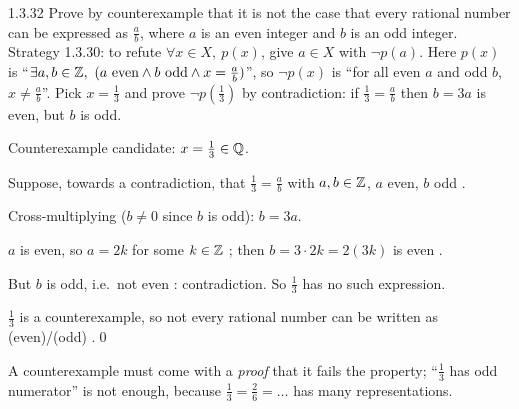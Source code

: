 \begin{bookex}[recommended]{1.3.32}
Prove by counterexample that it is not the case that every rational number can be expressed as $\frac ab$, where $a$ is an even integer and $b$ is an odd integer.
\solution
\given Strategy 1.3.30: to refute $\forall x\in X,\ p(x)$, give $a\in X$ with $\neg p(a)$. Here $p(x)$ is ``$\exists a,b\in\mathbb{Z},\ (a\text{ even}\wedge b\text{ odd}\wedge x=\frac ab)$'', so $\neg p(x)$ is ``for all even $a$ and odd $b$, $x\ne\frac ab$''.
\plan Pick $x=\frac13$ and prove $\neg p(\frac13)$ by contradiction: if $\frac13=\frac ab$ then $b=3a$ is even, but $b$ is odd.
\begin{steps}
\item Counterexample candidate: $x=\frac13\in\mathbb{Q}$.
\item Suppose, towards a contradiction, that $\frac13=\frac ab$ with $a,b\in\mathbb{Z}$, $a$ even, $b$ odd .
\item Cross-multiplying ($b\ne0$ since $b$ is odd): $b=3a$.
\item $a$ is even, so $a=2k$ for some $k\in\mathbb{Z}$ ; then $b=3\cdot2k=2(3k)$ is even .
\item But $b$ is odd, i.e.\ not even : contradiction. So $\frac13$ has no such expression.
\end{steps}
\conclusion $\frac13$ is a counterexample, so not every rational number can be written as (even)/(odd) .\qed
\begin{compare}
\item A counterexample must come with a \emph{proof} that it fails the property; ``$\frac13$ has odd numerator'' is not enough, because $\frac13=\frac26=\dots$ has many representations.
\end{compare}
\end{bookex}

